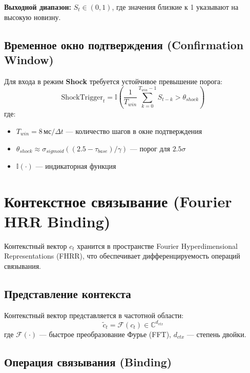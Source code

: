 \textbf{Выходной диапазон:} $S_t \in (0, 1)$, где значения близкие к 1 указывают на высокую новизну.

\subsection{Временное окно подтверждения (Confirmation Window)}

Для входа в режим \textbf{Shock} требуется устойчивое превышение порога:
\begin{equation}
\text{ShockTrigger}_t = \mathbb{I}\left(\frac{1}{T_{win}} \sum_{k=0}^{T_{win}-1} S_{t-k} > \theta_{shock}\right)
\label{eq:shock_trigger}
\end{equation}
где:
\begin{itemize}
    \item $T_{win} = 8 \, \text{мс} / \Delta t$ — количество шагов в окне подтверждения
    \item $\theta_{shock} \approx \sigma_{sigmoid}((2.5 - \tau_{base})/\gamma)$ — порог для $2.5\sigma$
    \item $\mathbb{I}(\cdot)$ — индикаторная функция
\end{itemize}

\section{Контекстное связывание (Fourier HRR Binding)}
\label{subsec:context_binding}

Контекстный вектор $c_t$ хранится в пространстве Fourier Hyperdimensional Representations (FHRR), что обеспечивает дифференцируемость операций связывания.

\subsection{Представление контекста}

Контекстный вектор представляется в частотной области:
\begin{equation}
\tilde{c}_t = \mathcal{F}(c_t) \in \mathbb{C}^{d_{ctx}}
\label{eq:context_fft}
\end{equation}
где $\mathcal{F}(\cdot)$ — быстрое преобразование Фурье (FFT), $d_{ctx}$ — степень двойки.

\subsection{Операция связывания (Binding)}

